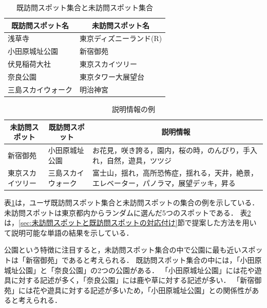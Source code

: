 \documentclass[submit]{ipsj}
\begin{document}
\begin{table}[t]
  \caption{既訪問スポット集合と未訪問スポット集合}
  \label{table:既訪問スポット集合と未訪問スポット集合}
  \centering
  \begin{tabular}{l|l}
  \hline
  \multicolumn{1}{c|}{既訪問スポット名} & \multicolumn{1}{c}{未訪問スポット名} \\ \hline
  浅草寺                           & 東京ディズニーランド(R)                \\
  小田原城址公園                       & 新宿御苑                         \\
  伏見稲荷大社                        & 東京スカイツリー                     \\
  奈良公園                          & 東京タワー大展望台                    \\
  三島スカイウォーク                     & 明治神宮                         \\ \hline
  \end{tabular}
\end{table}

\begin{table}[t]
  \caption{説明情報の例}
  \label{table:説明情報の例}
  \centering
  \begin{tabular}{l|l|l}
  \hline
  \multicolumn{1}{c|}{未訪問スポット} & \multicolumn{1}{c|}{既訪問スポット} & \multicolumn{1}{c}{説明情報}                     \\ \hline
  新宿御苑                      & 小田原城址公園                         & お花見，咲き誇る，園内，桜の時，のんびり，手入れ，自然，遊具，ツツジ          \\
  東京スカイツリー                     & 三島スカイウォーク                    & 富士山，揺れ，高所恐怖症，揺れる，天井，絶景，エレベーター，パノラマ，展望デッキ，昇る \\ \hline
  \end{tabular}
\end{table}

表\ref{table:既訪問スポット集合と未訪問スポット集合}は，ユーザ既訪問スポット集合と未訪問スポットの集合の例を示している．
未訪問スポットは東京都内からランダムに選んだ5つのスポットである．
表\ref{table:説明情報の例}は，\ref{sec:未訪問スポットと既訪問スポットの対応付け}節で提案した方法を用いて説明可能な単語の結果を示している．

公園という特徴に注目すると，未訪問スポット集合の中で公園に最も近いスポットは「新宿御苑」であると考えられる．
既訪問スポット集合の中には，「小田原城址公園」と「奈良公園」の2つの公園がある．
「小田原城址公園」には花や遊具に対する記述が多く，「奈良公園」には鹿や草に対する記述が多い．
「新宿御苑」には花や遊具に対する記述が多いため，「小田原城址公園」との関係性があると考えられる．
\end{document}
